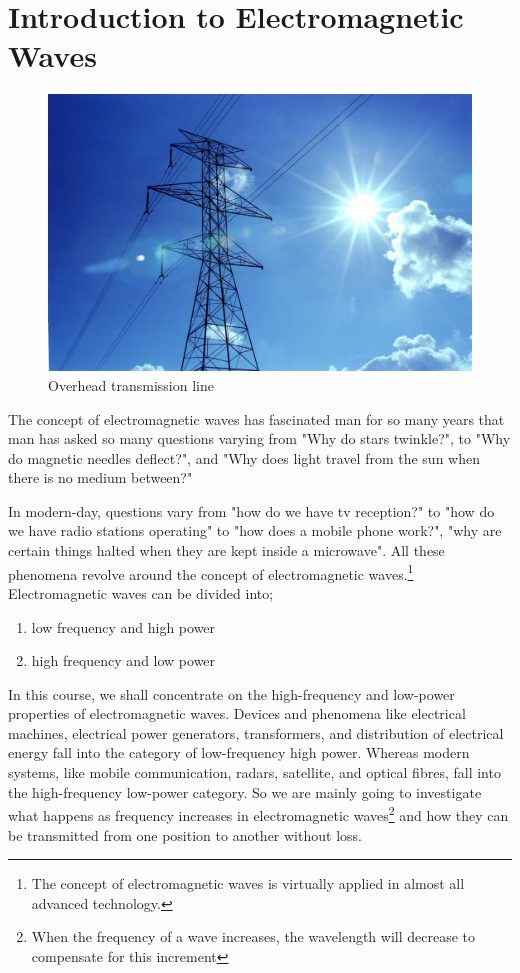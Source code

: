 \chapter{Introduction to Electromagnetic Waves}
\begin{figure}[h]
\centering
\includegraphics[width=1\linewidth]{./graphics/transmission1}
\caption{Overhead transmission line}
\end{figure}


The concept of electromagnetic waves has fascinated man for so many years that man has asked so many questions varying from "Why do stars twinkle?", to "Why do magnetic needles deflect?", and "Why does light travel from the sun when there is no medium between?"\newline

In modern-day, questions vary from "how do we have tv reception?" to "how do we have radio stations operating" to "how does a mobile phone work?", "why are certain things halted when they are kept inside a microwave". All these phenomena revolve around the concept of electromagnetic waves.\footnote{The concept of electromagnetic waves is virtually applied in almost all advanced technology.}\\

Electromagnetic waves can be divided into;
\begin{enumerate}
\item low frequency and high power
\item high frequency and low power
\end{enumerate}


In this course, we shall concentrate on the high-frequency and low-power properties of electromagnetic waves. Devices and phenomena like electrical machines, electrical power generators, transformers, and distribution of electrical energy fall into the category of low-frequency high power. Whereas modern systems, like mobile communication, radars, satellite, and optical fibres, fall into the high-frequency low-power category. So we are mainly going to investigate what happens as frequency increases in electromagnetic waves\footnote{When the frequency of a wave increases, the wavelength will decrease to compensate for this increment} and how they can be transmitted from one position to another without loss.\\

